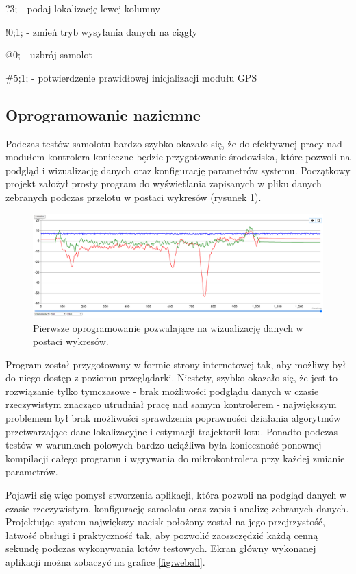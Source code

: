 \documentclass[12pt, a4paper]{article}
\begin{document}
?3; - podaj lokalizację lewej kolumny

!0;1; - zmień tryb wysyłania danych na ciągły

@0; - uzbrój samolot

\#5;1; - potwierdzenie prawidłowej inicjalizacji modułu GPS

\FloatBarrier
\subsection{Oprogramowanie naziemne}
Podczas testów samolotu bardzo szybko okazało się, że do efektywnej pracy nad modułem kontrolera konieczne będzie przygotowanie środowiska, które pozwoli na podgląd i wizualizację danych oraz konfigurację parametrów systemu. Początkowy projekt założył prosty program do wyświetlania zapisanych w pliku danych zebranych podczas przelotu w postaci wykresów (rysunek \ref{fig:staryprogram}).

 \begin{figure}[ht]
    \centering
    \includegraphics[width=1\textwidth]{starysystem}
    \caption{Pierwsze oprogramowanie pozwalające na wizualizację danych w postaci wykresów.}
    \label{fig:staryprogram}
\end{figure}

Program został przygotowany w formie strony internetowej tak, aby możliwy był do niego dostęp z poziomu przeglądarki. Niestety, szybko okazało się, że jest to rozwiązanie tylko tymczasowe - brak możliwości podglądu danych w czasie rzeczywistym znacząco utrudniał pracę nad samym kontrolerem - największym problemem był brak możliwości sprawdzenia poprawności działania algorytmów przetwarzające dane lokalizacyjne i estymacji trajektorii lotu. Ponadto podczas testów w warunkach polowych bardzo uciążliwa była konieczność ponownej kompilacji całego programu i wgrywania do mikrokontrolera przy każdej zmianie parametrów. 

Pojawił się więc pomysł stworzenia aplikacji, która pozwoli na podgląd danych w czasie rzeczywistym, konfigurację samolotu oraz zapis i analizę zebranych danych. Projektując system największy nacisk położony został na jego przejrzystość, łatwość obsługi i praktyczność tak, aby pozwolić zaoszczędzić każdą cenną sekundę podczas wykonywania lotów testowych. Ekran główny wykonanej aplikacji można zobaczyć na grafice \ref{fig:weball}.
\end{document}
